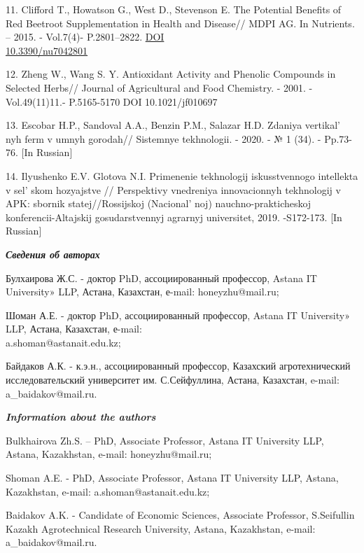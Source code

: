 \begin{references}
11. Clifford T., Howatson G., West D., Stevenson E. The Potential
Benefits of Red Beetroot Supplement\-ation in Health and Disease// MDPI
AG. In Nutrients. -- 2015. - Vol.7(4)- P.2801--2822.
\href{https://doi.org/10.3390/nu7042801}{DOI \\10.3390/nu7042801}

12. Zheng W., Wang S. Y. Antioxidant Activity and Phenolic Compounds in
Selected Herbs// Journal of Agricultural and Food Chemistry. - 2001. -
Vol.49(11)11.- P.5165-5170 DOI 10.1021/jf010697

13. Escobar H.P., Sandoval A.A., Benzin P.M., Salazar H.D. Zdaniya
vertikal' nyh ferm v umnyh gorodah// Sistemnye
tekhnologii. - 2020. - № 1 (34). - Pp.73-76. {[}In Russian{]}

14. Ilyushenko E.V. Glotova N.I. Primenenie tekhnologij iskusstvennogo
intellekta v sel' skom hozyajstve // Perspektivy
vnedreniya innovacionnyh tekhnologij v APK: sbornik statej//Rossijskoj
(Nacional' noj) nauchno-prakticheskoj
konferencii-Altajskij gosudarstvennyj agrarnyj universitet,
2019. -S172-173. {[}In Russian{]}
\end{references}

\begin{authorinfo}
\hspace{1em}\emph{{\bfseries Сведения об авторах}}

Булхаирова Ж.С. - доктор PhD, ассоциированный профессор, Astana IT
University» LLP, Астана, Казахстан, е-mail: honeyzhu@mail.ru;

Шоман А.Е. - доктор PhD, ассоциированный профессор, Astana IT
University» LLP, Астана, Казахстан, е-mail: \\a.shoman@astanait.edu.kz;

Байдаков А.К. - к.э.н., ассоциированный профессор, Казахский
агротехнический исследовательский университет им. С.Сейфуллина, Астана,
Казахстан, e-mail: a\_baidakov@mail.ru.

\hspace{1em}\emph{{\bfseries Information about the authors}}

Bulkhairova Zh.S. -- PhD, Associate Professor, Astana IT University LLP,
Astana, Kazakhstan, e-mail: honeyzhu@mail.ru;

Shoman A.E. - PhD, Associate Professor, Astana IT University LLP,
Astana, Kazakhstan, e-mail: a.shoman@astanait.edu.kz;

Baidakov A.K. - Candidate of Economic Sciences, Associate Professor,
S.Seifullin Kazakh Agrotechnical Research University, Astana,
Kazakhstan, e-mail: a\_baidakov@mail.ru.
\end{authorinfo}
